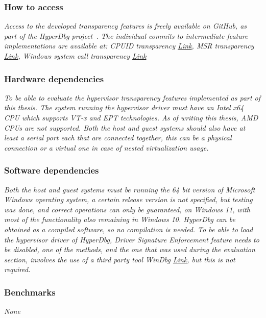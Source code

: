 \subsubsection{How to access}
\textit{Access to the developed transparency features is freely available on GitHub, as part of the HyperDbg project~\cite{hyperdbg}. 
The individual commits to intermediate feature implementations are available at: CPUID transparency \href{https://github.com/HyperDbg/HyperDbg/commit/56c2d400fddca22f314c1e5d16cadce6950eb262}{Link}, 
MSR transparency \href{https://github.com/HyperDbg/HyperDbg/commit/2cc3da3daebd793fd56d5c370ef6da398efa6d29}{Link}, Windows system call
transparency \href{https://github.com/HyperDbg/HyperDbg/commit/d0610661baf944259c33e921d3fc265e6a217ad8}{Link}
}


\subsubsection{Hardware dependencies}
\textit{To be able to evaluate the hypervisor transparency features implemented as part of this thesis.
The system running the hypervisor driver must have an Intel x64 CPU which supports VT-x and EPT technologies. As of writing this thesis, AMD CPUs are not supported.
Both the host and guest systems should also have at least a serial port each that are connected together, this can be a physical connection or a virtual one in case of nested virtualization usage.}

\subsubsection{Software dependencies}
\textit{Both the host and guest systems must be running the 64 bit version of Microsoft Windows operating system,
a certain release version is not specified, but testing was done, and correct operations can only be guaranteed, on Windows 11, with most of the functionality also remaining in Windows 10.
HyperDbg can be obtained as a compiled software, so no compilation is needed. To be able to load the hypervisor driver of HyperDbg,
Driver Signature Enforcement feature needs to be disabled, one of the methods, and the one that was used during the evaluation section, involves the use of a third party tool WinDbg \href{https://github.com/HyperDbg/HyperDbg/commit/2cc3da3daebd793fd56d5c370ef6da398efa6d29}{Link}, but this is not required.}

\subsubsection{Benchmarks}
\textit{None}

